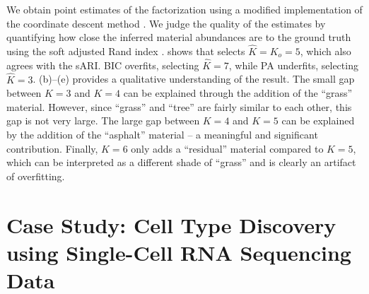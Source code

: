 We obtain point estimates of the factorization using a modified implementation of the coordinate descent method \citep{Cichocki-Phan_coorddesc_2009}.
We judge the quality of the estimates by quantifying how close the inferred material abundances are
to the ground truth
using the soft adjusted Rand index \citep[sARI;][]{Flynt_sARI_2019}.
 shows that \methodname selects $\widehat{K}=K_{o} =5$,
which also agrees with the sARI. %
BIC overfits, selecting $\widehat{K} = 7$, while PA underfits, selecting $\widehat{K}=3$.
(b)--(e) provides a qualitative understanding of the result.
The small gap between $K=3$ and $K=4$ can be explained through the addition of the ``grass'' material.
However, since ``grass'' and ``tree'' are fairly similar to each other, this gap is not very large.
The large gap between $K=4$ and $K=5$ can be explained by the addition of the ``asphalt'' material -- a meaningful and significant contribution.
Finally, $K=6$ only adds a ``residual'' material compared to $K=5$, which can be interpreted as a different shade of ``grass''
and is clearly an artifact of overfitting.

\section{Case Study: Cell Type Discovery using Single-Cell RNA Sequencing Data} \label{sec:case-study}

